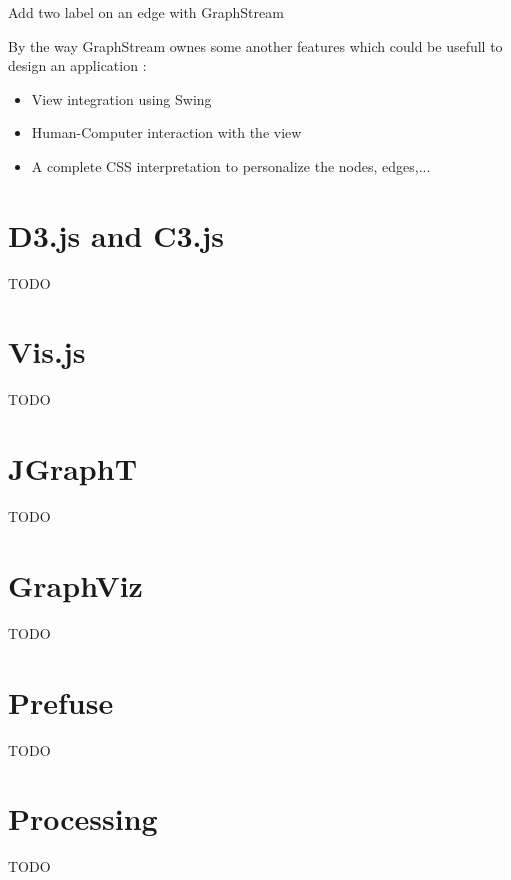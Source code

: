 \begin{listing}[h] %
    \centering
    \caption{Add two label on an edge with GraphStream}
    \label{lst:graphstream-edge-sprite}
\end{listing} %


By the way GraphStream ownes some another features which could be usefull to design an application :
\begin{itemize}
    \item View integration using Swing
    \item Human-Computer interaction with the view
    \item A complete CSS interpretation to personalize the nodes, edges,...
\end{itemize}


\section{D3.js and C3.js} %
\label{sec:D3.js and C3.js}

TODO



\section{Vis.js} %
\label{sec:Vis.js}

TODO



\section{JGraphT} %
\label{sec:JGraphT}

TODO



\section{GraphViz} %
\label{sec:GraphViz}

TODO



\section{Prefuse} %
\label{sec:Prefuse}

TODO



\section{Processing} %
\label{sec:Processing}

TODO





